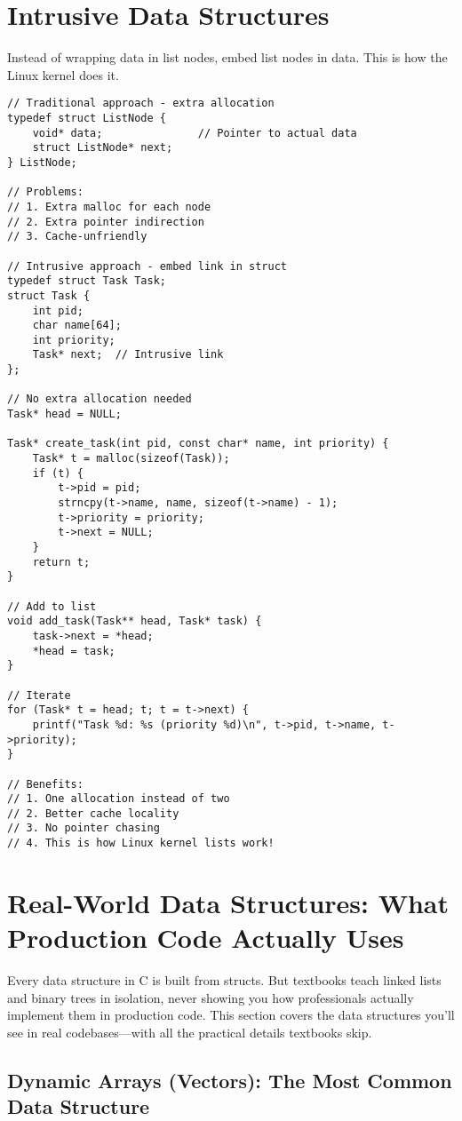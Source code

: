 \section{Intrusive Data Structures}

Instead of wrapping data in list nodes, embed list nodes in data. This is how the Linux kernel does it.

\begin{lstlisting}
// Traditional approach - extra allocation
typedef struct ListNode {
    void* data;               // Pointer to actual data
    struct ListNode* next;
} ListNode;

// Problems:
// 1. Extra malloc for each node
// 2. Extra pointer indirection
// 3. Cache-unfriendly

// Intrusive approach - embed link in struct
typedef struct Task Task;
struct Task {
    int pid;
    char name[64];
    int priority;
    Task* next;  // Intrusive link
};

// No extra allocation needed
Task* head = NULL;

Task* create_task(int pid, const char* name, int priority) {
    Task* t = malloc(sizeof(Task));
    if (t) {
        t->pid = pid;
        strncpy(t->name, name, sizeof(t->name) - 1);
        t->priority = priority;
        t->next = NULL;
    }
    return t;
}

// Add to list
void add_task(Task** head, Task* task) {
    task->next = *head;
    *head = task;
}

// Iterate
for (Task* t = head; t; t = t->next) {
    printf("Task %d: %s (priority %d)\n", t->pid, t->name, t->priority);
}

// Benefits:
// 1. One allocation instead of two
// 2. Better cache locality
// 3. No pointer chasing
// 4. This is how Linux kernel lists work!
\end{lstlisting}

\section{Real-World Data Structures: What Production Code Actually Uses}

Every data structure in C is built from structs. But textbooks teach linked lists and binary trees in isolation, never showing you how professionals actually implement them in production code. This section covers the data structures you'll see in real codebases—with all the practical details textbooks skip.

\subsection{Dynamic Arrays (Vectors): The Most Common Data Structure}

